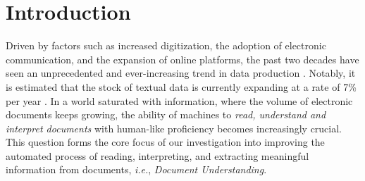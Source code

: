 \chapter{Introduction}
\label{chapter:introduction}

\minitoc
{}



Driven by factors such as increased digitization, the adoption of electronic communication, and the expansion of online platforms, the past two decades have seen an unprecedented and ever-increasing trend in data production \citep{hilbert2011world, clissa2022survey}. Notably, it is estimated that the stock of textual data is currently expanding at a rate of 7\% per year \citep{villalobos2022will}. In a world saturated with information, where the volume of electronic documents keeps growing, the ability of machines to \textit{read, understand and interpret documents} with human-like proficiency becomes increasingly crucial. This question forms the core focus of our investigation into improving the automated process of reading, interpreting, and extracting meaningful information from documents, \textit{i.e.}, \emph{Document Understanding}.


